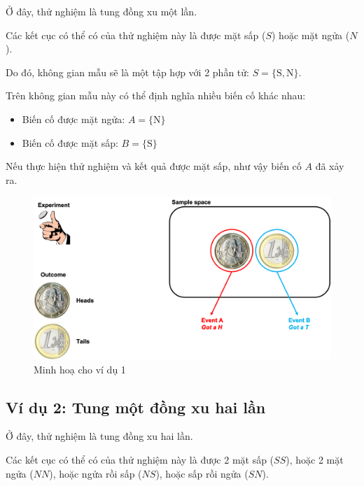 \documentclass[
]{book}
\providecommand{\tightlist}{%
  \setlength{\itemsep}{0pt}\setlength{\parskip}{0pt}}
\begin{document}
Ở đây, thử nghiệm là tung đồng xu một lần.

Các kết cục có thể có của thử nghiệm này là được mặt sấp (\(S\)) hoặc mặt ngửa (\(N\)).

Do đó, không gian mẫu sẽ là một tập hợp với 2 phần tử: \(S = \{\text{S},\text{N} \}\).

Trên không gian mẫu này có thể định nghĩa nhiều biến cố khác nhau:

\begin{itemize}
\tightlist
\item
  Biến cố được mặt ngửa: \(A = \{\text{N}\}\)
\item
  Biến cố được mặt sấp: \(B = \{\text{S}\}\)
\end{itemize}

Nếu thực hiện thử nghiệm và kết quả được mặt sấp, như vậy biến cố \(A\) đã xảy ra.

\begin{figure}

{\centering \includegraphics[width=1\linewidth]{figures/Picture01} 

}

\caption{Minh hoạ cho ví dụ 1}\label{fig:example1}
\end{figure}

\hypertarget{vuxed-dux1ee5-2-tung-mux1ed9t-ux111ux1ed3ng-xu-hai-lux1ea7n}{%
\subsection{Ví dụ 2: Tung một đồng xu hai lần}\label{vuxed-dux1ee5-2-tung-mux1ed9t-ux111ux1ed3ng-xu-hai-lux1ea7n}}

Ở đây, thử nghiệm là tung đồng xu hai lần.

Các kết cục có thể có của thử nghiệm này là được 2 mặt sấp (\(SS\)), hoặc 2 mặt ngửa (\(NN\)), hoặc ngửa rồi sấp (\(NS\)), hoặc sấp rồi ngửa (\(SN\)).
\end{document}
